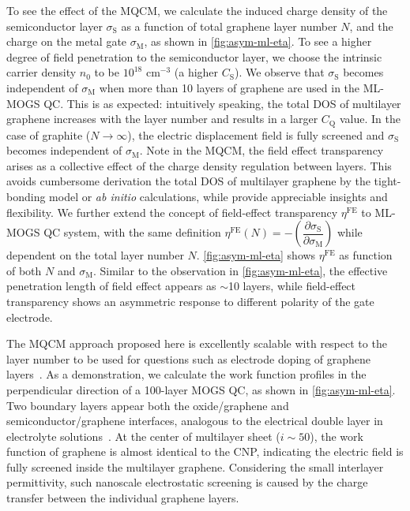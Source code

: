 To see the effect of the MQCM, we calculate the induced charge density
of the semiconductor layer $\sigma_{\mathrm{S}}$ as a function of
total graphene layer number $N$, and the charge on the metal gate
$\sigma_{\mathrm{M}}$, as shown in \autoref{fig:asym-ml-eta}.
%
To see a higher degree of field penetration to the semiconductor
layer, we choose the intrinsic carrier density $n_{0}$ to be $10^{18}$
cm$^{-3}$ (\ie a higher $C_{\mathrm{S}}$).
%
We observe that $\sigma_{\mathrm{S}}$ becomes independent of
$\sigma_{\mathrm{M}}$ when more than 10 layers of graphene are used in
the ML-MOGS QC.
%
This is as expected: intuitively speaking, the total DOS of multilayer
graphene increases with the layer number and results in a larger
$C_{\mathrm{Q}}$ value.
%
In the case of graphite ($N \to \infty$), the electric displacement
field is fully screened and $\sigma_{\mathrm{S}}$ becomes independent
of $\sigma_{\mathrm{M}}$.
%
Note in the MQCM, the field effect transparency arises as a collective
effect of the charge density regulation between layers. This avoids
cumbersome derivation the total DOS of multilayer graphene by the
tight-bonding model \autocite{Nilsson_2008_bitri_gr_electron} or
\textit{ab initio} calculations, while provide appreciable insights
and flexibility.
%
We further extend the concept of field-effect transparency
$\eta^{\mathrm{FE}}$ to ML-MOGS QC system, with the same definition
$\eta^{\mathrm{FE}}(N) = -\left(\dfrac{\partial
    \sigma_{\mathrm{S}}}{\partial \sigma_{\mathrm{M}}}\right)$ while
dependent on the total layer number $N$.
%
\autoref{fig:asym-ml-eta} shows $\eta^{\mathrm{FE}}$ as function of both $N$ and $\sigma_{\mathrm{M}}$.
%
Similar to the observation in \autoref{fig:asym-ml-eta}, the
effective penetration length of field effect appears as $\sim{}$10
layers, while field-effect transparency shows an asymmetric response
to different polarity of the gate electrode.
%

The MQCM approach proposed here is excellently scalable with respect
to the layer number to be used for questions such as electrode doping
of graphene
layers~\autocite{Pi_2009_metal_doping_gr,Giovannetti_2008_doping}.
%
As a demonstration, we calculate the work function profiles in the
perpendicular direction of a 100-layer MOGS QC, as shown in
\autoref{fig:asym-ml-eta}.
%
Two boundary layers appear both the oxide/graphene and
semiconductor\allowbreak{}/graphene interfaces, analogous to the
electrical double layer in electrolyte
solutions~\autocite{Bard_1980_electrochem_book}.
%
At the center of multilayer sheet ($i \sim{} 50$), the work function
of graphene is almost identical to the CNP, indicating the electric
field is fully screened inside the multilayer graphene.
%
Considering the small interlayer permittivity, such nano\-scale
electrostatic screening is caused by the charge transfer between the
individual graphene layers.

